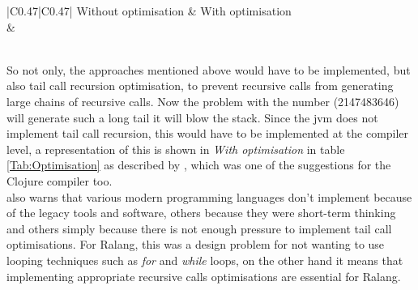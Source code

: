 \documentclass[a4paper]{article}
\begin{document}
	\begin{table}[h!]
		\begin{tabular}[t]{|C{0.47\linewidth}|C{0.47\linewidth}|}
			\hline Without optimisation & With optimisation \\ 
			\hline {} &  \\
			\hline 
		\end{tabular}
		\caption{Comparing with and without optimisation code.}
		\label{Tab:Optimisation}
	\end{table}\\
	So not only, the approaches mentioned above would have to be implemented, but also tail call recursion optimisation, to prevent recursive calls from generating large chains of recursive calls. Now the problem with the number (2147483646) will generate such a long tail it will blow the stack. Since the \ac{jvm} does not implement tail call recursion, this would have to be implemented at the compiler level, a representation of this is shown in \textit{With optimisation} in table \ref{Tab:Optimisation} as described by \cite{JVMlanguages}, which was one of the suggestions for the Clojure compiler too.\\
	
	\cite{RecurInClojure} also warns that various modern programming languages don't implement because of the legacy tools and software, others because they were short-term thinking and others simply because there is not enough pressure to implement tail call optimisations. For Ralang, this was a design problem for not wanting to use looping techniques such as \textit{for} and \textit{while} loops, on the other hand it means that implementing appropriate recursive calls optimisations are essential for Ralang.\\
	
\end{document}
